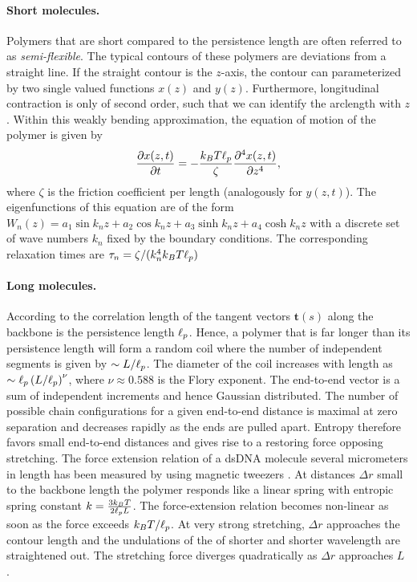 \paragraph{Short molecules.}
Polymers that are short compared to the persistence length are often referred to as \emph{semi-flexible}.
The typical contours of these polymers are deviations from a straight line. If the straight
contour is the $z$-axis, the contour can parameterized by two single valued functions
$x(z)$ and $y(z)$. Furthermore, longitudinal contraction is only of second order, such that we can 
identify the arclength with $z$. Within this weakly bending approximation, the equation of motion of the
polymer is given by \cite{Barkley_JChemPhys_79, Wiggins_BiophysJ_98, Wilhelm_PRL_96}
\begin{equation}
\frac{\partial x(z,t)}{\partial t}=-\frac{k_BT {\ell_p}}{\zeta} \frac{\partial^{4} x(z,t)}{\partial z^{4}},
\end{equation}
where $\zeta$ is the friction coefficient per length (analogously for $y(z,t)$). The eigenfunctions
of this equation are of the form $W_n(z)=a_1\sin k_nz+a_2\cos k_nz+a_3 \sinh k_nz+a_4\cosh k_nz$
with a discrete set of wave numbers $k_n$ fixed by the boundary conditions. The corresponding 
relaxation times are $\tau_n=\zeta/(k_n^{4}k_BT{\ell_p})$


\paragraph{Long molecules.} 
According to  the correlation length of the tangent vectors $\mathbf{t}(s)$ along the backbone
is the persistence length ${\ell_p}$. Hence, a polymer that is far longer than its persistence length will form a 
random coil where the number of independent segments is given by $\sim L/{\ell_p}$. The diameter of the coil 
increases with length as $\sim {\ell_p}\left(L/{\ell_p}\right)^{\nu}$, where $\nu\approx 0.588$ is the Flory exponent. 
The end-to-end vector is a sum of independent increments and hence Gaussian distributed. The number
of possible chain configurations for a given end-to-end distance is maximal 
at zero separation and decreases rapidly as the ends are pulled apart. Entropy therefore
favors small end-to-end distances  and gives rise to a restoring force opposing stretching.
The force extension relation of a dsDNA molecule several micrometers in length
has been measured by \citeauthor{Smith_Science_92} using magnetic tweezers \cite{Smith_Science_92}.
At distances $\Delta r$ small to the backbone length the polymer 
responds like a linear spring with entropic spring constant $k=\frac{3k_BT}{2{\ell_p} L}$.
The force-extension relation becomes non-linear as soon as the force exceeds $k_BT/{\ell_p}$.
At very strong stretching, $\Delta r$ approaches the contour length and the undulations of the
of shorter and shorter wavelength are straightened out. The stretching force diverges 
quadratically as $\Delta r$ approaches $L$ \cite{Marko_Macromolecules_95}.


